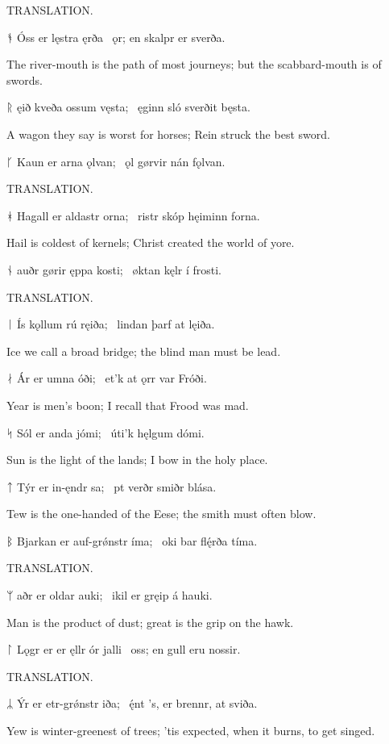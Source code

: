 \bvb TRANSLATION.\evb\evg


\bvg\bva ᚬ Óss er lęstra ęrða \hld\ ǫr; en skalpr er sverða.\eva

\bvb The river-mouth is the path of most journeys; but the scabbard-mouth is of swords.\evb\evg


\bvg\bva ᚱ ęið kveða ossum vęsta; \hld\ ęginn sló sverðit bęsta.\eva

\bvb A wagon they say is worst for horses; Rein struck the best sword.\evb\evg


\bvg\bva ᚴ Kaun er arna ǫlvan; \hld\ ǫl gørvir nán fǫlvan.\eva

\bvb TRANSLATION.\evb\evg


\bvg\bva ᚼ Hagall er aldastr orna; \hld\ ristr skóp hęiminn forna.\eva

\bvb Hail is coldest of kernels; Christ created the world of yore.\evb\evg


\bvg\bva ᚾ auðr gørir ęppa kosti; \hld\ øktan kęlr í frosti.\eva

\bvb TRANSLATION.\evb\evg


\bvg\bva ᛁ Ís kǫllum rú ręiða; \hld\ lindan þarf at lęiða.\eva

\bvb Ice we call a broad bridge; the blind man must be lead.\evb\evg


\bvg\bva ᛅ Ár er umna óði; \hld\ et’k at ǫrr var Fróði.\eva

\bvb Year is men’s boon; I recall that Frood was mad.\evb\evg


\bvg\bva ᛋ Sól er anda jómi; \hld\ úti’k hęlgum dómi.\eva

\bvb Sun is the light of the lands; I bow in the holy place.\evb\evg


\bvg\bva ᛏ Týr er in-ęndr sa; \hld\ pt verðr smiðr blása.\eva

\bvb Tew is the one-handed of the Eese; the smith must often blow.\evb\evg


\bvg\bva ᛒ Bjarkan er auf-grǿnstr íma; \hld\ oki bar flę́rða tíma.\eva

\bvb TRANSLATION.\evb\evg


\bvg\bva ᛘ aðr er oldar auki; \hld\ ikil er gręip á hauki.\eva

\bvb Man is the product of dust; great is the grip on the hawk.\evb\evg


\bvg\bva ᛚ Lǫgr er er ęllr ór jalli \hld\ oss; en gull eru nossir.\eva

\bvb TRANSLATION.\evb\evg


\bvg\bva ᛦ Ýr er etr-grǿnstr iða; \hld\ ę́nt ’s, er brennr, at sviða. \eva

\bvb Yew is winter-greenest of trees; ’tis expected, when it burns, to get singed.\evb\evg

\sectionline
